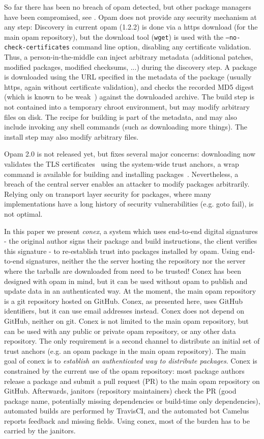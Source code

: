 \documentclass[nocopyrightspace]{sigplanconf}
\begin{document}
So far there has been no breach of opam detected, but other package managers have been compromised, see \cite{cabal,maven,npm,rubygems}.
Opam does not provide any security mechanism at any step:
Discovery in current opam (1.2.2) is done via a https download (for the main opam repository), but the download tool (\texttt{wget}) is used with the \texttt{--no-check-certificates} command line option, disabling any certificate validation.
Thus, a person-in-the-middle can inject arbitrary metadata (additional patches, modified packages, modified checksums, ...) during the discovery step.
A package is downloaded using the URL specified in the metadata of the package (usually https, again without certificate validation), and checks the recorded MD5 digest (which is known to be weak~\cite{rfc6151}) against the downloaded archive.
The build step is not contained into a temporary chroot environment, but may modify arbitrary files on disk.
The recipe for building is part of the metadata, and may also include invoking any shell commands (such as downloading more things).
The install step may also modify arbitrary files.

Opam 2.0 is not released yet, but fixes several major concerns:
downloading now validates the TLS certificates~\cite{opampr} using the system-wide trust anchors,
a wrap command is available for building and installing packages~\cite{wrappr}.
Nevertheless, a breach of the central server enables an attacker to modify packages arbitrarily.
Relying only on transport layer security for packages, where many implementations have a long history of security vulnerabilities (e.g. goto fail), is not optimal.

In this paper we present \emph{conex}, a system which uses end-to-end digital signatures - the original author signs their package and build instructions, the client verifies this signature - to re-establish trust into packages installed by opam.
Using end-to-end signatures, neither the the server hosting the repository nor the server where the tarballs are downloaded from need to be trusted!
Conex has been designed with opam in mind, but it can be used without opam to publish and update data in an authenticated way.
At the moment, the main opam repository is a git repository hosted on GitHub.
Conex, as presented here, uses GitHub identifiers, but it can use email addresses instead.
Conex does not depend on GitHub, neither on git.
Conex is not limited to the main opam repository, but can be used with any public or private opam repository, or any other data repository.
The only requirement is a second channel to distribute an initial set of trust anchors (e.g. an opam package in the main opam repository).
The main goal of conex is to \emph{establish an authenticated way to distribute packages}.
Conex is constrained by the current use of the opam repository:  most package authors release a package and submit a pull request (PR) to the main opam repository on GitHub.
Afterwards, janitors (repository maintainers) check the PR (good package name, potentially missing dependencies or build-time only dependencies), automated builds are performed by TravisCI, and the automated bot Camelus~\cite{camelus} reports feedback and missing fields.
Using conex, most of the burden has to be carried by the janitors.
\end{document}
